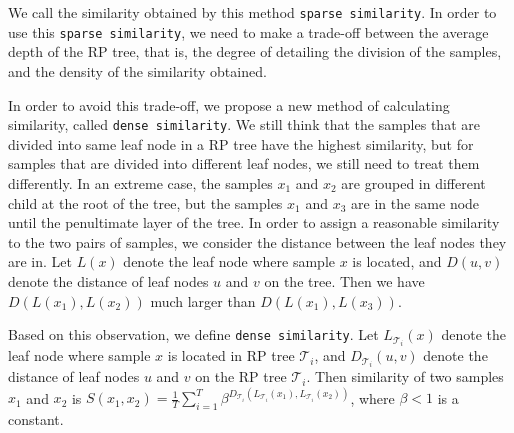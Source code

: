 We call the similarity obtained by this method \texttt{sparse similarity}. In order to use this \texttt{sparse similarity}, we need to make a trade-off between the average depth of the RP tree, that is, the degree of detailing the division of the samples, and the density of the similarity obtained.

In order to avoid this trade-off, we propose a new method of calculating similarity, called \texttt{dense similarity}. 
We still think that the samples that are divided into same leaf node in a RP tree have the highest similarity, but for samples that are divided into different leaf nodes, we still need to treat them differently.
In an extreme case, the samples $x_1$ and $x_2$ are grouped in different child at the root of the tree, but the samples $x_1$ and $x_3$ are in the same node until the penultimate layer of the tree.
In order to assign a reasonable similarity to the two pairs of samples, we consider the distance between the leaf nodes they are in. 
Let $L(x)$ denote the leaf node where sample $x$ is located, and $D(u,v)$ denote the distance of leaf nodes $u$ and $v$ on the tree. Then we have $D(L(x_1),L(x_2))$ much larger than $D(L(x_1),L(x_3))$.

Based on this observation, we define \texttt{dense similarity}. Let $L_{\mathcal{T}_i}(x)$ denote the leaf node where sample $x$ is located in RP tree $\mathcal{T}_i$, and $D_{\mathcal{T}_i}(u,v)$ denote the distance of leaf nodes $u$ and $v$ on the RP tree $\mathcal{T}_i$. Then similarity of two samples $x_1$ and $x_2$ is $S(x_1,x_2)=\frac{1}{T}\sum_{i=1}^T\beta^{D_{\mathcal{T}_i}(L_{\mathcal{T}_i}(x_1),L_{\mathcal{T}_i}(x_2))}$, where $\beta<1$ is a constant.